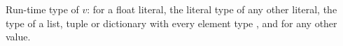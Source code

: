Run-time type of $v$:  for a float literal, the literal type of
any other literal, the type of a list, tuple or dictionary with every element type , and
 for any other value.
